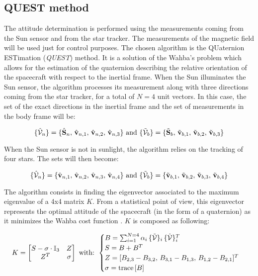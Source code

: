 \subsection{QUEST method}

The attitude determination is performed using the measurements coming from the Sun sensor and from the star tracker. The measurements of the magnetic field will be used just for control purposes. The chosen algorithm is the QUaternion ESTimation (\textit{QUEST}) method. It is a solution of the Wahba's problem which allows for the estimation of the quaternion describing the relative orientation of the spacecraft with respect to the inertial frame. When the Sun illuminates the Sun sensor, the algorithm processes its measurement along with three directions coming from the star tracker, for a total of $N = 4$ unit vectors. In this case, the set of the exact directions in the inertial frame and the set of measurements in the body frame will be:

\begin{equation}
    \{ \hat{\mathcal{V}}_n \} = \{ \hat{\mathbf{S}}_n, \, \hat{\mathbf{v}}_{n,1}, \, \hat{\mathbf{v}}_{n,2}, \, \hat{\mathbf{v}}_{n,3} \} \text{  and  } \{ \Tilde{\mathcal{V}}_b \} = \{ \Tilde{\mathbf{S}}_b, \, \Tilde{\mathbf{v}}_{b,1}, \, \Tilde{\mathbf{v}}_{b,2}, \, \Tilde{\mathbf{v}}_{b,3} \} 
\end{equation}

When the Sun sensor is not in sunlight, the algorithm relies on the tracking of four stars. The sets will then become:

\begin{equation}
    \{ \hat{\mathcal{V}}_n \} = \{ \hat{\mathbf{v}}_{n,1}, \, \hat{\mathbf{v}}_{n,2}, \, \hat{\mathbf{v}}_{n,3}, \, \hat{\mathbf{v}}_{n,4} \} \text{  and  } \{ \Tilde{\mathcal{V}}_b \} = \{ \Tilde{\mathbf{v}}_{b,1}, \, \Tilde{\mathbf{v}}_{b,2}, \, \Tilde{\mathbf{v}}_{b,3}, \, \Tilde{\mathbf{v}}_{b,4} \} 
\end{equation}

The algorithm consists in finding the eigenvector associated to the maximum eigenvalue of a 4x4 matrix $K$. From a statistical point of view, this eigenvector represents the optimal attitude of the spacecraft (in the form of a quaternion) as it minimizes the Wahba cost function \cite{bernelli}. $K$ is composed as following:

\begin{equation}
    K = \begin{bmatrix}
    S - \sigma \cdot \mathbb{I}_3 & Z \\
    Z^T & \sigma
    \end{bmatrix}
    \text{ with: } 
    \begin{cases}
    B = \sum_{i=1}^{N=4} \alpha_i \,  \{ \Tilde{\mathcal{V}} \}_i \, \{ \hat{\mathcal{V}} \}_i^T \\
    S = B + B^T \\
    Z = [B_{2,3} - B_{3,2}, \, B_{3,1} - B_{1,3}, \, B_{1,2} - B_{2,1}]^T \\
    \sigma = \mathrm{trace} \, [B]
    \end{cases}
\end{equation}

